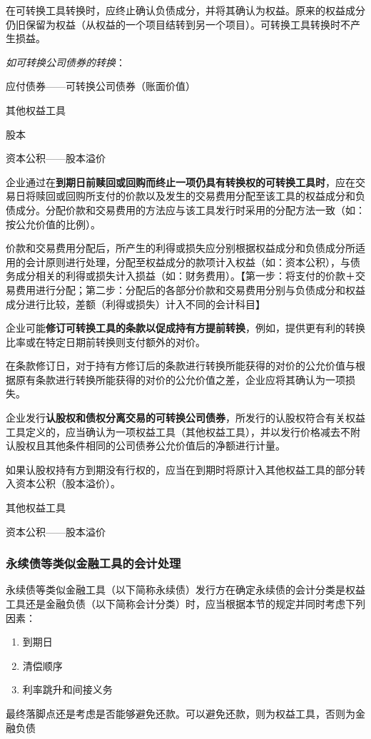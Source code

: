 \documentclass[UTF8,12pt]{ctexart}
\newenvironment{Dr}{%
	\begin{list}{}%
		{
			\setlength{\leftmargin}{2em}
			\setlength{\labelwidth}{2em}
			\setlength{\labelsep}{0pt}
			\setlength{\itemindent}{0pt}
			\setlength{\listparindent}{0pt}
			\setlength{\parsep}{0pt}
			\setlength{\topsep}{0pt}
		}
		\item[\textbf{借：}]
	}{%
	\end{list}
}
\newenvironment{Cr}{%
	\begin{list}{}%
		{
			\setlength{\leftmargin}{3em}
			\setlength{\labelwidth}{2em}
			\setlength{\labelsep}{0pt}
			\setlength{\itemindent}{0pt}
			\setlength{\listparindent}{0pt}
			\setlength{\parsep}{0pt}
			\setlength{\topsep}{0pt}
		}
		\item[\textbf{贷：}]
	}{%
	\end{list}
}
\numberwithin{equation}{section} %
\numberwithin{figure}{section}
\numberwithin{table}{section}
\begin{document}
	在可转换工具转换时，应终止确认负债成分，并将其确认为权益。原来的权益成分仍旧保留为权益（从权益的一个项目结转到另一个项目）。可转换工具转换时不产生损益。
	
	\textit{如可转换公司债券的转换}：
	
	\begin{Dr}
		应付债券——可转换公司债券（账面价值）
		
		其他权益工具
	\end{Dr}
	\begin{Cr}
		股本
		
		资本公积——股本溢价
	\end{Cr}
	
	
	企业通过在\textbf{到期日前赎回或回购而终止一项仍具有转换权的可转换工具时}，应在交易日将赎回或回购所支付的价款以及发生的交易费用分配至该工具的权益成分和负债成分。分配价款和交易费用的方法应与该工具发行时采用的分配方法一致（如：按公允价值的比例）。
	
	价款和交易费用分配后，所产生的利得或损失应分别根据权益成分和负债成分所适用的会计原则进行处理，分配至权益成分的款项计入权益（如：资本公积），与债务成分相关的利得或损失计入损益（如：财务费用）。【第一步：将支付的价款＋交易费用进行分配；第二步：分配后的各部分价款和交易费用分别与负债成分和权益成分进行比较，差额（利得或损失）计入不同的会计科目】
	
	企业可能\textbf{修订可转换工具的条款以促成持有方提前转换}，例如，提供更有利的转换比率或在特定日期前转换则支付额外的对价。
	
	在条款修订日，对于持有方修订后的条款进行转换所能获得的对价的公允价值与根据原有条款进行转换所能获得的对价的公允价值之差，企业应将其确认为一项损失。
	
	企业发行\textbf{认股权和债权分离交易的可转换公司债券}，所发行的认股权符合有关权益工具定义的，应当确认为一项权益工具（其他权益工具），并以发行价格减去不附认股权且其他条件相同的公司债券公允价值后的净额进行计量。
	
	如果认股权持有方到期没有行权的，应当在到期时将原计入其他权益工具的部分转入资本公积（股本溢价）。
	
	\begin{Dr}
		其他权益工具
	\end{Dr}
	\begin{Cr}
		资本公积——股本溢价
	\end{Cr}

	
	
	\subsubsection{永续债等类似金融工具的会计处理}
	永续债等类似金融工具（以下简称永续债）发行方在确定永续债的会计分类是权益工具还是金融负债（以下简称会计分类）时，应当根据本节的规定并同时考虑下列因素：
	\begin{enumerate}
		\item 到期日
		
		\item 清偿顺序
		
		\item 利率跳升和间接义务
	\end{enumerate}
	最终落脚点还是考虑是否能够避免还款。可以避免还款，则为权益工具，否则为金融负债
	
\end{document}

